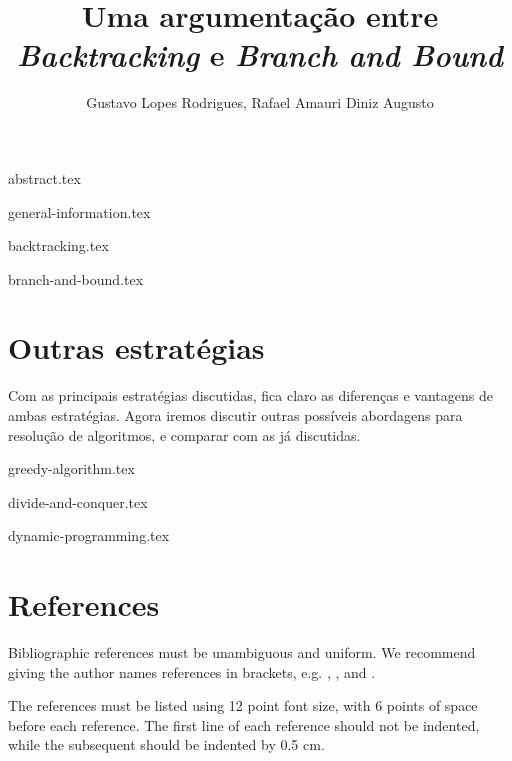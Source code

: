 \documentclass[12pt]{article}
\title{Uma argumentação entre \emph{Backtracking} e \emph{Branch and Bound}}
\author{Gustavo Lopes Rodrigues\inst{1}, Rafael Amauri Diniz Augusto\inst{2}}
\begin{document}
 

  \maketitle

  {abstract.tex}

  {general-information.tex}

  {backtracking.tex}

  {branch-and-bound.tex}

  \section{Outras estratégias} \label{sec:other-strategies}

    Com as principais estratégias discutidas, fica claro as diferenças 
    e vantagens de ambas estratégias. Agora iremos discutir outras possíveis
    abordagens para resolução de algoritmos, e comparar com as já discutidas.

  {greedy-algorithm.tex}

  {divide-and-conquer.tex}

  {dynamic-programming.tex}

  \section{References}

    Bibliographic references must be unambiguous and uniform.  We recommend giving
    the author names references in brackets, e.g. \cite{knuth:84},
    \cite{boulic:91}, and \cite{smith:99}.

    The references must be listed using 12 point font size, with 6 points of space
    before each reference. The first line of each reference should not be
    indented, while the subsequent should be indented by 0.5 cm.

  
  
\end{document}
